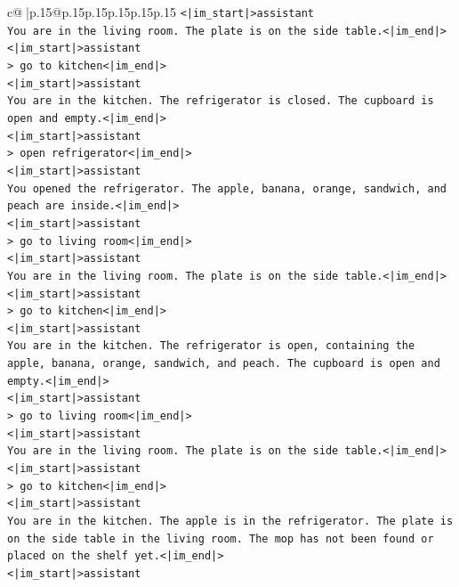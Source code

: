 \documentclass{article}
\begin{document}
{\begin{supertabular}{c@{$\;$}|p{.15\linewidth}@{}p{.15\linewidth}p{.15\linewidth}p{.15\linewidth}p{.15\linewidth}p{.15\linewidth}}
{{{\texttt{<|im\_start|>assistant} \\
\texttt{You are in the living room. The plate is on the side table.<|im\_end|>} \\
\texttt{<|im\_start|>assistant} \\
\texttt{> go to kitchen<|im\_end|>} \\
\texttt{<|im\_start|>assistant} \\
\texttt{You are in the kitchen. The refrigerator is closed. The cupboard is open and empty.<|im\_end|>} \\
\texttt{<|im\_start|>assistant} \\
\texttt{> open refrigerator<|im\_end|>} \\
\texttt{<|im\_start|>assistant} \\
\texttt{You opened the refrigerator. The apple, banana, orange, sandwich, and peach are inside.<|im\_end|>} \\
\texttt{<|im\_start|>assistant} \\
\texttt{> go to living room<|im\_end|>} \\
\texttt{<|im\_start|>assistant} \\
\texttt{You are in the living room. The plate is on the side table.<|im\_end|>} \\
\texttt{<|im\_start|>assistant} \\
\texttt{> go to kitchen<|im\_end|>} \\
\texttt{<|im\_start|>assistant} \\
\texttt{You are in the kitchen. The refrigerator is open, containing the apple, banana, orange, sandwich, and peach. The cupboard is open and empty.<|im\_end|>} \\
\texttt{<|im\_start|>assistant} \\
\texttt{> go to living room<|im\_end|>} \\
\texttt{<|im\_start|>assistant} \\
\texttt{You are in the living room. The plate is on the side table.<|im\_end|>} \\
\texttt{<|im\_start|>assistant} \\
\texttt{> go to kitchen<|im\_end|>} \\
\texttt{<|im\_start|>assistant} \\
\texttt{You are in the kitchen. The apple is in the refrigerator. The plate is on the side table in the living room. The mop has not been found or placed on the shelf yet.<|im\_end|>} \\
\texttt{<|im\_start|>assistant} \\
}}}
\end{supertabular}}
\end{document}
